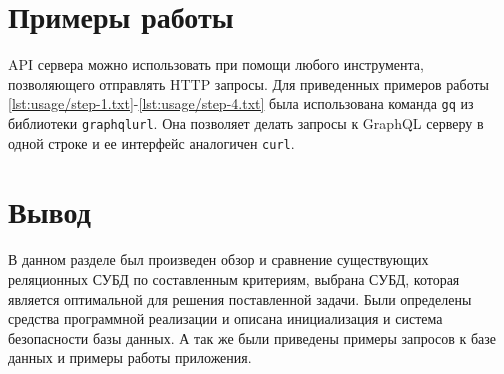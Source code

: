 \section{Примеры работы}

API сервера можно использовать при помощи любого инструмента, позволяющего отправлять HTTP запросы. Для приведенных примеров работы \ref{lst:usage/step-1.txt}-\ref{lst:usage/step-4.txt} была использована команда \texttt{gq} из библиотеки \texttt{graphqlurl}\cite{graphqlurl}. Она позволяет делать запросы к GraphQL серверу в одной строке и ее интерфейс аналогичен \texttt{curl}\cite{curl}.


\newpage


\newpage



\section*{Вывод}

В данном разделе был произведен обзор и сравнение существующих реляционных СУБД по составленным критериям, выбрана СУБД, которая является оптимальной для решения поставленной задачи. Были определены средства программной реализации и описана инициализация и система безопасности базы данных. А так же были приведены примеры запросов к базе данных и примеры работы приложения.